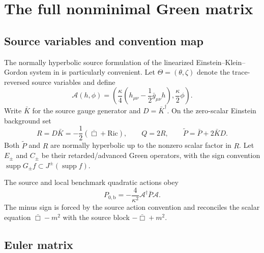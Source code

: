 \documentclass[11pt]{article}
\theoremstyle{definition}
\theoremstyle{remark}
\newcommand{\gbar}{\bar g}
\newcommand{\supp}{\operatorname{supp}}
\newcommand{\cA}{\mathcal A}
\begin{document}
\section{The full nonminimal Green matrix}

\subsection{Source variables and convention map}

The normally hyperbolic source formulation of the linearized Einstein--Klein--Gordon
system in \cite{Hack2014} is particularly convenient.  Let
$\Theta=(\theta,\zeta)$ denote the trace-reversed source variables and define
\begin{equation}
 \cA(h,\phi)=\left(\frac{\kappa}{4}
 \left(h_{\mu\nu}-\frac12\gbar_{\mu\nu}h\right),\frac{\kappa}{2}\phi\right).
 \label{eq:Amap}
\end{equation}
Write $\bar K$ for the source gauge generator and $D=\bar K^\dagger$.  On the
zero-scalar Einstein background set
\begin{equation}
 R=D\bar K=-\frac12(\bar\Box+\mathrm{Ric}),
 \qquad Q=2R,
 \qquad \widetilde P=\bar P+2\bar K D.
 \label{eq:sourceops}
\end{equation}
Both $\widetilde P$ and $R$ are normally hyperbolic up to the nonzero scalar factor in
$R$.  Let $E_\pm$ and $C_\pm$ be their retarded/advanced Green operators, with the
sign convention $\supp G_\pm f\subset J^\pm(\supp f)$.

The source and local benchmark quadratic actions obey
\begin{equation}
 P_{0,\mathrm{b}}=-\frac{4}{\kappa^2}\cA^\dagger\bar P\cA.
 \label{eq:signmap}
\end{equation}
The minus sign is forced by the source action convention and reconciles the scalar
equation $\bar\Box-m^2$ with the source block $-\bar\Box+m^2$.

\subsection{Euler matrix}
\end{document}

